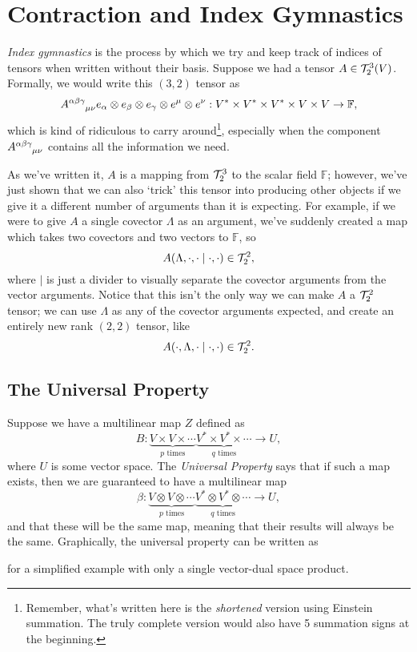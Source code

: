 \chapter{Contraction and Index Gymnastics}
\emph{Index gymnastics} is the process by which we try and keep track of indices of tensors when written without their basis.
Suppose we had a tensor $A \in \mathcal{T}^3_2(V)$.
Formally, we would write this $(3,2)$ tensor as
\[ \tensor{A}{^{\alpha\beta\gamma}_{\mu\nu}} e_\alpha \otimes e_\beta \otimes e_\gamma \otimes e^\mu \otimes e^\nu : V^* \times V^* \times V^* \times V \times V \to \mathbb{F}, \]
which is kind of ridiculous to carry around\footnote{Remember, what's written here is the \emph{shortened} version using Einstein summation. The truly complete version would also have 5 summation signs at the beginning.}, especially when the component $\tensor{A}{^{\alpha\beta\gamma}_{\mu\nu}}$ contains all the information we need.

As we've written it, $A$ is a mapping from $\mathcal{T}^3_2$ to the scalar field $\mathbb{F}$; however, we've just shown that we can also `trick' this tensor into producing other objects if we give it a different number of arguments than it is expecting.
For example, if we were to give $A$ a single covector $\Lambda$ as an argument, we've suddenly created a map which takes two covectors and two vectors to $\mathbb{F}$, so 
\[ A(\Lambda,\cdot,\cdot\mid\cdot,\cdot) \in \mathcal{T}^2_2, \]
where $\mid$ is just a divider to visually separate the covector arguments from the vector arguments.
Notice that this isn't the only way we can make $A$ a $\mathcal{T}^2_2$ tensor; we can use $\Lambda$ as any of the covector arguments expected, and create an entirely new rank $(2,2)$ tensor, like
\[ A(\cdot,\Lambda,\cdot\mid\cdot,\cdot) \in \mathcal{T}^2_2. \]

\section{The Universal Property}
Suppose we have a multilinear map $Z$ defined as
\[ B : \underbrace{V \times V \times \cdots}_{\text{$p$ times}}\underbrace{V^* \times V^* \times \cdots}_{\text{$q$ times}} \to U, \]
where $U$ is some vector space.
The \emph{Universal Property} says that if such a map exists, then we are guaranteed to have a multilinear map
\[ \beta : \underbrace{V \otimes V \otimes \cdots}_{\text{$p$ times}}\underbrace{V^* \otimes V^* \otimes \cdots}_{\text{$q$ times}} \to U, \]
and that these will be the same map, meaning that their results will always be the same.
Graphically, the universal property can be written as
\begin{center}
\end{center}
for a simplified example with only a single vector-dual space product.

